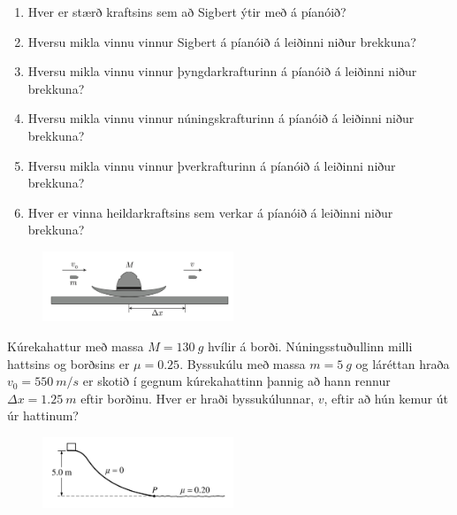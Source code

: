 \begin{enumerate}[label = \textbf{Dæmi \thechapter.\arabic*.}]
\begin{minipage}{\linewidth}
\end{minipage}
    
    \begin{enumerate}[label = \textbf{(\alph*)}]
        \item Hver er stærð kraftsins sem að Sigbert ýtir með á píanóið?
        
        \item Hversu mikla vinnu vinnur Sigbert á píanóið á leiðinni niður brekkuna?
        
        \item Hversu mikla vinnu vinnur þyngdarkrafturinn á píanóið á leiðinni niður brekkuna?
        
        \item Hversu mikla vinnu vinnur núningskrafturinn á píanóið á leiðinni niður brekkuna?
        
        \item Hversu mikla vinnu vinnur þverkrafturinn á píanóið á leiðinni niður brekkuna?
        
        \item Hver er vinna heildarkraftsins sem verkar á píanóið á leiðinni niður brekkuna? 
    \end{enumerate}

    
\begin{minipage}{\linewidth}
\begin{figure}
\vspace{-0.75cm}
\includegraphics[width=2.25in]{images/hattur.png}
\end{figure}

    \item Kúrekahattur með massa $M = \SI{130}{g}$ hvílir á borði. Núningsstuðullinn milli hattsins og borðsins er $\mu = 0.25$. Byssukúlu með massa $m = \SI{5}{g}$ og láréttan hraða $v_0 = \SI{550}{m/s}$ er skotið í gegnum kúrekahattinn þannig að hann rennur $\Delta x = \SI{1.25}{m}$ eftir borðinu. Hver er hraði byssukúlunnar, $v$, eftir að hún kemur út úr hattinum?
    
\end{minipage}
    
\begin{minipage}{\linewidth}
\begin{figure}
\vspace{-1cm}
\includegraphics[width=2.25in]{images/nun.png}
\end{figure}


\end{minipage}
\end{enumerate}
